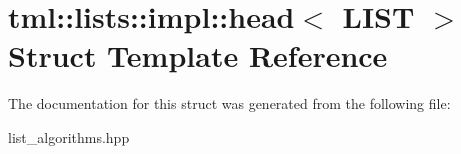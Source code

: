 \hypertarget{structtml_1_1lists_1_1impl_1_1head}{\section{tml\+:\+:lists\+:\+:impl\+:\+:head$<$ L\+I\+S\+T $>$ Struct Template Reference}
\label{structtml_1_1lists_1_1impl_1_1head}
}


The documentation for this struct was generated from the following file\+:\begin{DoxyCompactItemize}
\item 
list\+\_\+algorithms.\+hpp\end{DoxyCompactItemize}
